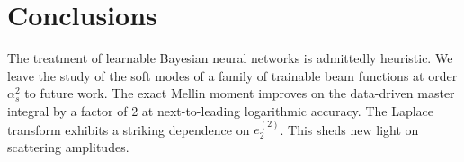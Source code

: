 \section{Conclusions}\label{sec:conclusions}

The treatment of learnable Bayesian neural networks is admittedly
heuristic. We leave the study of the soft modes of a family of trainable
beam functions at order $\alpha_s^2$ to future work. The exact Mellin
moment improves on the data-driven master integral by a factor of 2 at
next-to-leading logarithmic accuracy. The Laplace transform exhibits a
striking dependence on $e_2^{(2)}$. This sheds new light on scattering
amplitudes.

